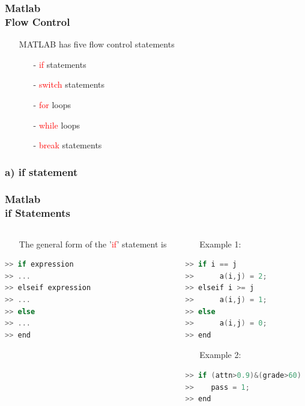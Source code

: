 \documentclass[hyperref={pdfpagelabels=true}]{beamer}
\begin{document}
\begin{frame}
\frametitle{Matlab \\ {\small Flow Control}}
\begin{itemize}
\item[\textcolor{gray}{\ding{56}}] MATLAB has five flow control statements
\begin{itemize}
\item[-] \textcolor{red}{if} statements
\item[-] \textcolor{red}{switch} statements
\item[-] \textcolor{red}{for} loops
\item[-] \textcolor{red}{while} loops
\item[-] \textcolor{red}{break} statements
\end{itemize}
\end{itemize}
\end{frame}

\subsubsection{a) if statement}

\begin{frame}[fragile]
\frametitle{Matlab \\ {\small if Statements}}
\begin{columns}
    \begin{column}{0.49\textwidth}
        \begin{itemize}
         \item[\ding{59}] The general form of the '\textcolor{red}{if}' statement is 
         \end{itemize}
\begin{tcolorbox}
\scriptsize{
\begin{lstlisting}[language=C++,basicstyle=\ttfamily,keywordstyle=\color{red}]
>> if expression
>> ...
>> elseif expression
>> ...
>> else
>> ...
>> end
\end{lstlisting} }
\end{tcolorbox}
      \end{column}
    \begin{column}{0.5\textwidth}
        \begin{itemize}
         \item[\ding{59}] Example 1: 
         \end{itemize}
\small{
\begin{lstlisting}[language=C++,basicstyle=\ttfamily,keywordstyle=\color{red}]
>> if i == j
>>      a(i,j) = 2;
>> elseif i >= j
>>      a(i,j) = 1;
>> else
>>      a(i,j) = 0;
>> end
\end{lstlisting} }
 \begin{itemize}
         \item[\ding{59}] Example 2: 
         \end{itemize}
\scriptsize{
\begin{lstlisting}[language=C++,basicstyle=\ttfamily,keywordstyle=\color{red}]
>> if (attn>0.9)&(grade>60)
>>    pass = 1;
>> end
\end{lstlisting} }
    \end{column}
\end{columns}
\end{frame}
\end{document}
